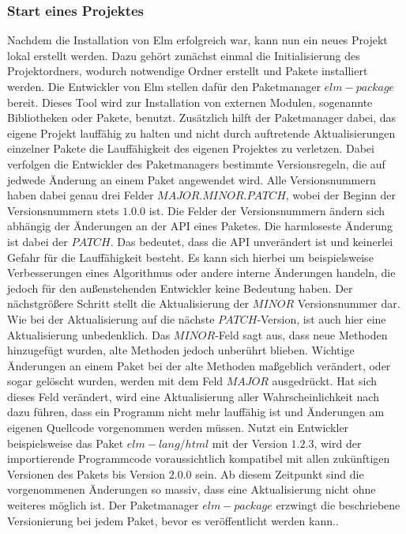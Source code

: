 \subsubsection{Start eines Projektes}
\label{sec:start-eines-projektes}
Nachdem die Installation von Elm erfolgreich war, kann nun ein neues Projekt lokal erstellt werden. Dazu gehört zunächst einmal die Initialisierung des Projektordners, wodurch notwendige Ordner erstellt und Pakete installiert werden. Die Entwickler von Elm stellen dafür den Paketmanager $elm-package$ bereit. Dieses Tool wird zur Installation von externen Modulen, sogenannte Bibliotheken oder Pakete, benutzt. Zusätzlich hilft der Paketmanager dabei, das eigene Projekt lauffähig zu halten und nicht durch auftretende Aktualisierungen einzelner Pakete die Lauffähigkeit des eigenen Projektes zu verletzen. Dabei verfolgen die Entwickler des Paketmanagers bestimmte Versionsregeln, die auf jedwede Änderung an einem Paket angewendet wird. Alle Versionsnummern haben dabei genau drei Felder $MAJOR.MINOR.PATCH$, wobei der Beginn der Versionsnummern stets $1.0.0$ ist. Die Felder der Versionsnummern ändern sich abhängig der Änderungen an der API eines Paketes. Die harmloseste Änderung ist dabei der $PATCH$. Das bedeutet, dass die \ac{API} unverändert ist und keinerlei Gefahr für die Lauffähigkeit besteht. Es kann sich hierbei um beispielsweise Verbesserungen eines Algorithmus oder andere interne Änderungen handeln, die jedoch für den außenstehenden Entwickler keine Bedeutung haben.
Der nächstgrößere Schritt stellt die Aktualisierung der $MINOR$ Versionsnummer dar. Wie bei der Aktualisierung auf die nächste $PATCH$-Version, ist auch hier eine Aktualisierung unbedenklich. Das $MINOR$-Feld sagt aus, dass neue Methoden hinzugefügt wurden, alte Methoden jedoch unberührt blieben.
Wichtige Änderungen an einem Paket bei der alte Methoden maßgeblich verändert, oder sogar gelöscht wurden, werden mit dem Feld $MAJOR$ ausgedrückt. Hat sich dieses Feld verändert, wird eine Aktualisierung aller Wahrscheinlichkeit nach dazu führen, dass ein Programm nicht mehr lauffähig ist und Änderungen am eigenen Quellcode vorgenommen werden müssen.
Nutzt ein Entwickler beispielsweise das Paket $elm-lang/html$ mit der Version $1.2.3$, wird der importierende Programmcode voraussichtlich kompatibel mit allen zukünftigen Versionen des Pakets bis Version $2.0.0$ sein. Ab diesem Zeitpunkt sind die vorgenommenen Änderungen so massiv, dass eine Aktualisierung nicht ohne weiteres möglich ist. Der Paketmanager $elm-package$ erzwingt die beschriebene Versionierung bei jedem Paket, bevor es veröffentlicht werden kann.\cite[Vgl.]{semantic-versioning}.
